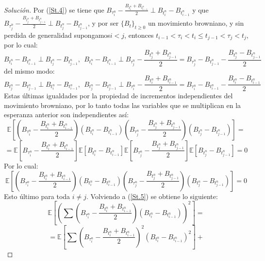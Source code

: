 \documentclass[11pt,notitlepage]{article}
\newenvironment{solucion}
  {\begin{proof}[Solución]}
  {\end{proof}}
\begin{document}
\begin{enumerate}
\begin{solucion}
    Por (\ref{St.4}) se tiene que \(B_{\tau_{i}^{n}} - \frac{B_{t_{i}^{n}}+ B_{t_{i-1}^{n}}}{2} \perp B_{t_{i}^{n}}- B_{t_{i-1}^{n}}\) y que \(B_{\tau_{j}^{n}} - \frac{B_{t_{j}^{n}}+ B_{t_{j-1}^{n}}}{2} \perp B_{t_{j}^{n}}- B_{t_{j-1}^{n}}\), y por ser \(\{B_t\}_{t\geq0}\) un movimiento browniano, y sin perdida de generalidad supongamos\(i<j\), entonces \(t_{i-1} < \tau_i < t_{i} \leq t_{j-1}< \tau_j < t_j\), por lo cual:
    \[B_{t_{i}^{n}}- B_{t_{i-1}^{n}} \perp B_{t_{j}^{n}}- B_{t_{j-1}^{n}}, \ \ B_{t_{i}^{n}}- B_{t_{i-1}^{n}} \perp B_{\tau_{j}^{n}} - \frac{B_{t_{j}^{n}}+ B_{t_{j-1}^{n}}}{2} = B_{\tau_{j}^{n}} - B_{t_{j-1}^{n}} - \frac{B_{t_{j}^{n}} - B_{t_{j-1}^{n}}}{2}\] 
    del mismo modo: 
     \[B_{t_{j}^{n}}- B_{t_{j-1}^{n}} \perp B_{t_{i}^{n}}- B_{t_{i-1}^{n}}, \ \ B_{t_{j}^{n}}- B_{t_{j-1}^{n}} \perp B_{\tau_{i}^{n}} - \frac{B_{t_{i}^{n}}+ B_{t_{i-1}^{n}}}{2} = B_{\tau_{i}^{n}} - B_{t_{i-1}^{n}} - \frac{B_{t_{i}^{n}} - B_{t_{i-1}^{n}}}{2}\]
     Estas últimas igualdades por la propiedad de incrementos independientes del movimiento browniano, por lo tanto todas las variables que se multiplican en la esperanza anterior son independientes así:
     \[\mathbb{E}\left[\left(B_{\tau_{i}^{n}} - \frac{B_{t_{i}^{n}}+ B_{t_{i-1}^{n}}}{2} \right)\left(B_{t_{i}^{n}}- B_{t_{i-1}^{n}}\right)\left(B_{\tau_{j}^{n}} - \frac{B_{t_{j}^{n}}+ B_{t_{j-1}^{n}}}{2} \right)\left(B_{t_{j}^{n}}- B_{t_{j-1}^{n}}\right)\right] = \]
     \[= \mathbb{E}\left[B_{\tau_{i}^{n}} - \frac{B_{t_{i}^{n}}+ B_{t_{i-1}^{n}}}{2}\right]\mathbb{E}\left[B_{t_{i}^{n}}- B_{t_{i-1}^{n}}\right]\mathbb{E}\left[B_{\tau_{j}^{n}} - \frac{B_{t_{j}^{n}}+ B_{t_{j-1}^{n}}}{2}\right]\mathbb{E}\left[B_{t_{j}^{n}}- B_{t_{j-1}^{n}}\right]= 0\]
     Por lo cual:
     \begin{equation}\label{St.6}
         \mathbb{E}\left[\left(B_{\tau_{i}^{n}} - \frac{B_{t_{i}^{n}}+ B_{t_{i-1}^{n}}}{2} \right)\left(B_{t_{i}^{n}}- B_{t_{i-1}^{n}}\right)\left(B_{\tau_{j}^{n}} - \frac{B_{t_{j}^{n}}+ B_{t_{j-1}^{n}}}{2} \right)\left(B_{t_{j}^{n}}- B_{t_{j-1}^{n}}\right)\right] = 0
     \end{equation}
     Esto último para toda \(i \neq j\). Volviendo a (\ref{St.5}) se obtiene lo siguiente: 
     \[
       \mathbb{E}\left[\left(\sum\left(B_{\tau_{i}^{n}} - \frac{B_{t_{i}^{n}}+ B_{t_{i-1}^{n}}}{2} \right)\left(B_{t_{i}^{n}}- B_{t_{i-1}^{n}}\right)\right)^2\right] =
    \]
    \[
        = \mathbb{E}\left[\sum\left(B_{\tau_{i}^{n}} - \frac{B_{t_{i}^{n}}+ B_{t_{i-1}^{n}}}{2} \right)^{2}\left(B_{t_{i}^{n}}- B_{t_{i-1}^{n}}\right)^2\right] +
    \]
    \[
\]
\end{solucion}
\end{enumerate}
\end{document}
